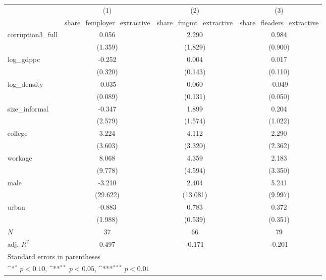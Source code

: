 {
\def\sym#1{\ifmmode^{#1}\else\(^{#1}\)\fi}
\begin{tabular}{l*{3}{c}}
\hline\hline
            &\multicolumn{1}{c}{(1)}&\multicolumn{1}{c}{(2)}&\multicolumn{1}{c}{(3)}\\
            &\multicolumn{1}{c}{share\_femployer\_extractive}&\multicolumn{1}{c}{share\_fmgmt\_extractive}&\multicolumn{1}{c}{share\_fleaders\_extractive}\\
\hline
corruption3\_full&       0.056         &       2.290         &       0.984         \\
            &     (1.359)         &     (1.829)         &     (0.900)         \\
[1em]
log\_gdppc   &      -0.252         &       0.004         &       0.017         \\
            &     (0.320)         &     (0.143)         &     (0.110)         \\
[1em]
log\_density &      -0.035         &       0.060         &      -0.049         \\
            &     (0.089)         &     (0.131)         &     (0.050)         \\
[1em]
size\_informal&      -0.347         &       1.899         &       0.204         \\
            &     (2.579)         &     (1.574)         &     (1.022)         \\
[1em]
college     &       3.224         &       4.112         &       2.290         \\
            &     (3.603)         &     (3.320)         &     (2.362)         \\
[1em]
workage     &       8.068         &       4.359         &       2.183         \\
            &     (9.778)         &     (4.594)         &     (3.350)         \\
[1em]
male        &      -3.210         &       2.404         &       5.241         \\
            &    (29.622)         &    (13.081)         &     (9.997)         \\
[1em]
urban       &      -0.883         &       0.783         &       0.372         \\
            &     (1.988)         &     (0.539)         &     (0.351)         \\
\hline
\(N\)       &          37         &          66         &          79         \\
adj. \(R^{2}\)&       0.497         &      -0.171         &      -0.201         \\
\hline\hline
\multicolumn{4}{l}{\footnotesize Standard errors in parentheses}\\
\multicolumn{4}{l}{\footnotesize \sym{*} \(p<0.10\), \sym{**} \(p<0.05\), \sym{***} \(p<0.01\)}\\
\end{tabular}
}
